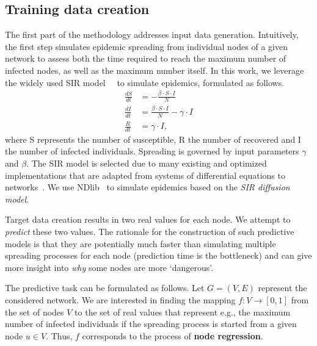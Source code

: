 \documentclass{article}
\begin{document}
\subsection{Training data creation}\label{sec:training-data}
The first part of the methodology addresses input data generation. Intuitively, the first step simulates epidemic spreading from individual nodes of a given network to assess both the time required to reach the maximum number of infected nodes, as well as the maximum number itself. In this work, we leverage the widely used SIR model~\cite{Kermack1927Epidemics}~\cite{ndlib} to simulate epidemics, formulated as follows.
\begin{align*}
    \frac{dS}{dt} &= - \frac{\beta \cdot S \cdot I}{N} \\
    \frac{dI}{dt} &= \frac{\beta \cdot S \cdot I}{N} - \gamma \cdot I \\
    \frac{R}{dt} &= \gamma \cdot I,
\end{align*}
\noindent where S represents the number of susceptible, R the number of recovered and I the number of infected individuals. Spreading is governed by input parameters $\gamma$ and $\beta$. The SIR model is selected due to many existing and optimized implementations that are adapted from systems of differential equations to networks~\cite{Guille2013diffusion}. We use NDlib~\cite{ndlib} to simulate epidemics based on the \emph{SIR diffusion model}.

Target data creation results in two real values for each node. We attempt to \emph{predict} these two values. The rationale for the construction of such predictive models is that they are potentially much faster than simulating multiple spreading processes for each node (prediction time is the bottleneck) and can give more insight into \emph{why} some nodes are more `dangerous'. 

The predictive task can be formulated as follows. Let $G = (V,E)$ represent the considered network. We are interested in finding the mapping $f: V \rightarrow [0, 1]$ from the set of nodes $V$ to the set of real values that represent e.g., the maximum number of infected individuals if the spreading process is started from a given node $u \in V$. Thus, $f$ corresponds to the process of \textbf{node regression}.
\end{document}
